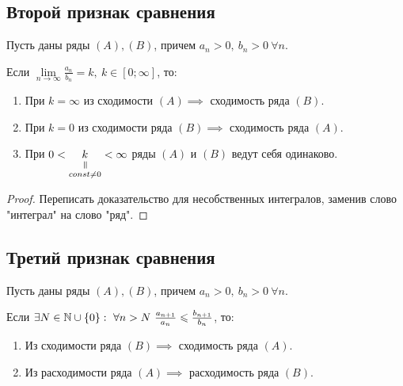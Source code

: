 \subsection{Второй признак сравнения}

\begin{theorem}
    Пусть даны ряды $ (A),(B) $, причем $a_n > 0, \ b_n > 0 \ \forall n$.

    Если $\underset{n\rightarrow\infty}{\lim}\frac{a_n}{b_n}=k, \ k\in [0;\infty]$, то:
    \begin{enumerate}
        \item При $k=\infty$ из сходимости $(A) \implies$ сходимость ряда $(B)$.
        \item При $k=0$ из сходимости ряда $(B) \implies$ сходимость ряда $(A)$.
        \item При $0<\equalto{k}{const \ne 0}<\infty$ ряды $(A)$ и $(B)$ ведут себя одинаково.
    \end{enumerate}
\end{theorem}

\begin{proof}
    Переписать доказательство для несобственных интегралов, заменив слово "интеграл" на слово "ряд".
\end{proof}

\subsection{Третий признак сравнения}

\begin{theorem}
    Пусть даны ряды $ (A),(B) $, причем $a_n > 0, \ b_n > 0 \ \forall n$.

    Если $\exists N \in \N \cup \{0\}: \ \forall n > N \ \frac{a_{n+1}}{a_n}\leqslant\frac{b_{n+1}}{b_n} $, то:
    \begin{enumerate}
        \item Из сходимости ряда $(B) \implies$ сходимость ряда $(A)$.
        \item Из расходимости ряда $(A) \implies$ расходимость ряда $(B)$.
    \end{enumerate}
\end{theorem}

